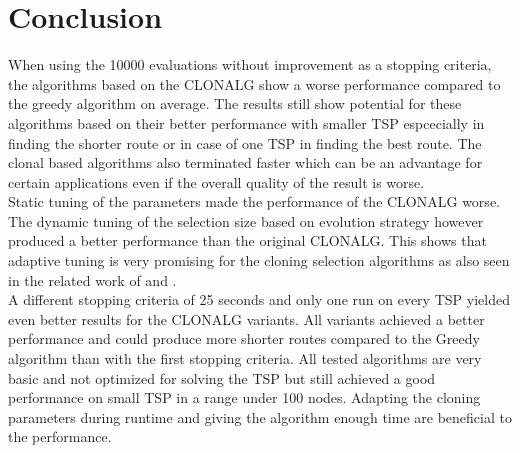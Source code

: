 \chapter{Conclusion}
\label{chap:con}
When using the 10000 evaluations without improvement as a stopping criteria, the algorithms based on the CLONALG show a worse performance compared to the greedy algorithm on average. The results still show potential for these algorithms based on their better performance with smaller TSP espcecially in finding the shorter route or in case of one TSP in finding the best route. The clonal based algorithms also terminated faster which can be an advantage for certain applications even if the overall quality of the result is worse.\\
Static tuning of the parameters made the performance of the CLONALG worse. The dynamic tuning of the selection size based on evolution strategy however produced a better performance than the original CLONALG. This shows that adaptive tuning is very promising for the cloning selection algorithms as also seen in the related work of \cite{Garret04} and \Cite{RIFF09}.\\
A different stopping criteria of 25 seconds and only one run on every TSP yielded even better results for the CLONALG variants. All variants achieved a better performance and could produce more shorter routes compared to the Greedy algorithm than with the first stopping criteria. All tested algorithms are very basic and not optimized for solving the TSP but still achieved a good performance on small TSP in a range under 100 nodes. Adapting the cloning parameters during runtime and giving the algorithm enough time are beneficial to the performance.